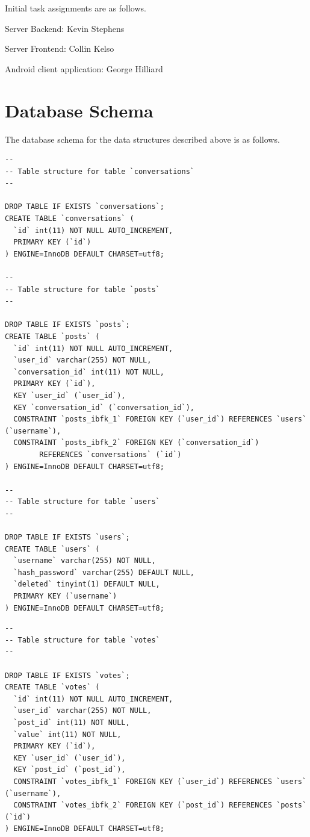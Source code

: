\documentclass[11pt]{scrartcl}
\let\stdsection\section
\renewcommand\section{\newpage\stdsection}
\begin{document}
    \noindent
    Initial task assignments are as follows.

    \begin{description*}
        \item[Server Backend:] Kevin Stephens
        \item[Server Frontend:] Collin Kelso
        \item[Android client application:] George Hilliard
    \end{description*}

\clearpage
\section{Database Schema}
    The database schema for the data structures described above is as follows.

    \begin{verbatim}
--
-- Table structure for table `conversations`
--

DROP TABLE IF EXISTS `conversations`;
CREATE TABLE `conversations` (
  `id` int(11) NOT NULL AUTO_INCREMENT,
  PRIMARY KEY (`id`)
) ENGINE=InnoDB DEFAULT CHARSET=utf8;

--
-- Table structure for table `posts`
--

DROP TABLE IF EXISTS `posts`;
CREATE TABLE `posts` (
  `id` int(11) NOT NULL AUTO_INCREMENT,
  `user_id` varchar(255) NOT NULL,
  `conversation_id` int(11) NOT NULL,
  PRIMARY KEY (`id`),
  KEY `user_id` (`user_id`),
  KEY `conversation_id` (`conversation_id`),
  CONSTRAINT `posts_ibfk_1` FOREIGN KEY (`user_id`) REFERENCES `users` (`username`),
  CONSTRAINT `posts_ibfk_2` FOREIGN KEY (`conversation_id`)
        REFERENCES `conversations` (`id`)
) ENGINE=InnoDB DEFAULT CHARSET=utf8;

--
-- Table structure for table `users`
--

DROP TABLE IF EXISTS `users`;
CREATE TABLE `users` (
  `username` varchar(255) NOT NULL,
  `hash_password` varchar(255) DEFAULT NULL,
  `deleted` tinyint(1) DEFAULT NULL,
  PRIMARY KEY (`username`)
) ENGINE=InnoDB DEFAULT CHARSET=utf8;
    \end{verbatim}

    \newpage

    \begin{verbatim}
--
-- Table structure for table `votes`
--

DROP TABLE IF EXISTS `votes`;
CREATE TABLE `votes` (
  `id` int(11) NOT NULL AUTO_INCREMENT,
  `user_id` varchar(255) NOT NULL,
  `post_id` int(11) NOT NULL,
  `value` int(11) NOT NULL,
  PRIMARY KEY (`id`),
  KEY `user_id` (`user_id`),
  KEY `post_id` (`post_id`),
  CONSTRAINT `votes_ibfk_1` FOREIGN KEY (`user_id`) REFERENCES `users` (`username`),
  CONSTRAINT `votes_ibfk_2` FOREIGN KEY (`post_id`) REFERENCES `posts` (`id`)
) ENGINE=InnoDB DEFAULT CHARSET=utf8;
    \end{verbatim}
\end{document}
